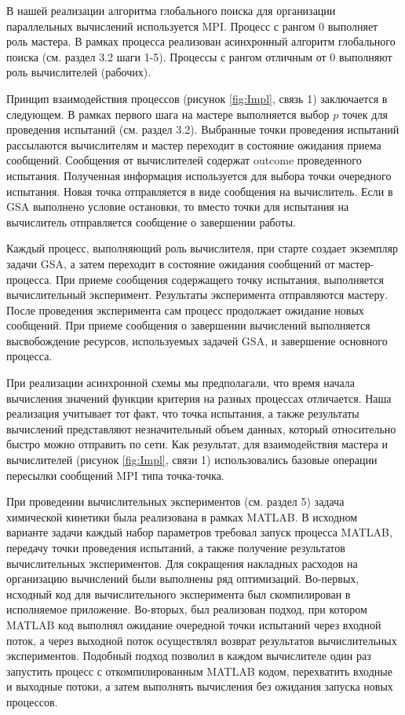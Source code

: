 \documentclass[mathematics,article,submit,pdftex,moreauthors]{Definitions/mdpi}
\begin{document}
В нашей реализации алгоритма глобального поиска для организации параллельных вычислений используется MPI. Процесс с рангом 0 выполняет роль мастера. В рамках процесса реализован асинхронный алгоритм глобального поиска (см. раздел 3.2 шаги 1-5). Процессы с рангом отличным от 0 выполняют роль вычислителей (рабочих).

Принцип взаимодействия процессов (рисунок \ref{fig:Impl}, связь 1) заключается в следующем. В рамках первого шага на мастере выполняется выбор $p$ точек для проведения испытаний (см. раздел 3.2). Выбранные точки проведения испытаний рассылаются вычислителям и мастер переходит в состояние ожидания приема сообщений. Сообщения от вычислителей содержат outcome проведенного испытания. Полученная информация используется для выбора точки очередного испытания. Новая точка отправляется в виде сообщения на вычислитель. Если в GSA выполнено условие остановки, то вместо точки для испытания на вычислитель отправляется сообщение о завершении работы.

Каждый процесс, выполняющий роль вычислителя, при старте создает экземпляр задачи GSA, а затем переходит в состояние ожидания сообщений от мастер-процесса. При приеме сообщения содержащего точку испытания, выполняется вычислительный эксперимент. Результаты эксперимента отправляются мастеру. После проведения эксперимента сам процесс продолжает ожидание новых сообщений. При приеме сообщения о завершении вычислений выполняется высвобождение ресурсов, используемых задачей GSA, и завершение основного процесса.

При реализации асинхронной схемы мы предполагали, что время начала вычисления значений функции критерия на разных процессах отличается. Наша реализация учитывает тот факт, что точка испытания, а также результаты вычислений представляют незначительный объем данных, который относительно быстро можно отправить по сети. Как результат, для взаимодействия мастера и вычислителей (рисунок \ref{fig:Impl}, связи 1) использовались базовые операции пересылки сообщений MPI типа точка-точка. 

При проведении вычислительных экспериментов (см. раздел 5) задача химической кинетики была реализована в рамках MATLAB. В исходном варианте задачи каждый набор параметров требовал запуск процесса MATLAB, передачу точки проведения испытаний, а также получение результатов вычислительных экспериментов. Для сокращения накладных расходов на организацию вычислений были выполнены ряд оптимизаций. Во-первых, исходный код для вычислительного эксперимента был скомпилирован в исполняемое приложение. Во-вторых, был реализован подход, при котором MATLAB код выполнял ожидание очередной точки испытаний через входной поток, а через выходной поток осуществлял возврат результатов вычислительных экспериментов. Подобный подход позволил в каждом вычислителе один раз запустить процесс с откомпилированным MATLAB кодом, перехватить входные и выходные потоки, а затем выполнять вычисления без ожидания запуска новых процессов. 
\end{document}
